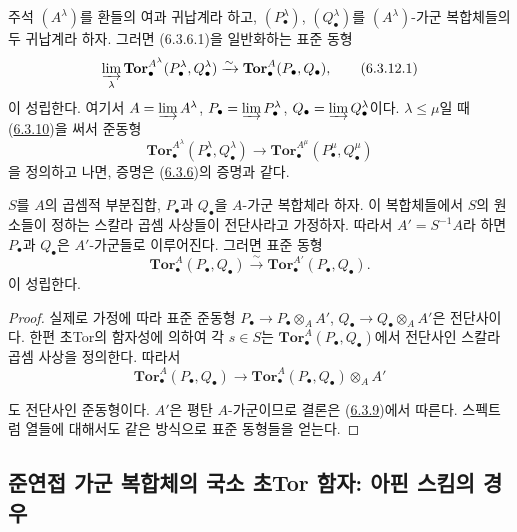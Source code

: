 \begin{namedtheorem}[6.3.12]{주석}
\label{III.6.3.12-fr}
$(A^\lambda)$를 환들의 여과 귀납계라 하고,
$(P_\bullet^\lambda)$, $(Q_\bullet^\lambda)$를
$(A^\lambda)$-가군 복합체들의 두 귀납계라 하자. 그러면
(6.3.6.1)을 일반화하는 표준 동형
\[
  \varinjlim_\lambda
  \mathbf{Tor}_\bullet^{A^\lambda}
  (P_\bullet^\lambda,Q_\bullet^\lambda)
  \xrightarrow{\sim}
  \mathbf{Tor}_\bullet^A(P_\bullet,Q_\bullet),
  \tag{6.3.12.1}\label{III.6.3.12.1.fr}
\]
이 성립한다. 여기서 $A=\varinjlim A^\lambda$,
$P_\bullet=\varinjlim P_\bullet^\lambda$,
$Q_\bullet=\varinjlim Q_\bullet^\lambda$이다. $\lambda\leqslant\mu$일
때 (\hyperref[III.6.3.10-fr]{6.3.10})을 써서 준동형
\[
  \mathbf{Tor}_\bullet^{A^\lambda}
  (P_\bullet^\lambda,Q_\bullet^\lambda)
  \longrightarrow
  \mathbf{Tor}_\bullet^{A^\mu}
  (P_\bullet^\mu,Q_\bullet^\mu)
\]
을 정의하고 나면, 증명은
(\hyperref[III.6.3.6-fr]{6.3.6})의 증명과 같다.
\end{namedtheorem}

\begin{proposition}[6.3.13]
\label{III.6.3.13-fr}
$S$를 $A$의 곱셈적 부분집합, $P_\bullet$과 $Q_\bullet$을 $A$-가군
복합체라 하자. 이 복합체들에서 $S$의 원소들이 정하는 스칼라 곱셈
사상들이 전단사라고 가정하자. 따라서 $A'=S^{-1}A$라 하면
$P_\bullet$과 $Q_\bullet$은 $A'$-가군들로 이루어진다. 그러면 표준
동형
\[
  \mathbf{Tor}_\bullet^A(P_\bullet,Q_\bullet)
  \xrightarrow{\sim}
  \mathbf{Tor}_\bullet^{A'}(P_\bullet,Q_\bullet).
\]
이 성립한다.
\end{proposition}

\begin{proof}
실제로 가정에 따라 표준 준동형
$P_\bullet\to P_\bullet\otimes_A A'$,
$Q_\bullet\to Q_\bullet\otimes_A A'$은 전단사이다. 한편 초Tor의
함자성에 의하여 각 $s\in S$는
$\mathbf{Tor}_\bullet^A(P_\bullet,Q_\bullet)$에서 전단사인 스칼라 곱셈
사상을 정의한다. 따라서
\[
  \mathbf{Tor}_\bullet^A(P_\bullet,Q_\bullet)
  \longrightarrow
  \mathbf{Tor}_\bullet^A(P_\bullet,Q_\bullet)\otimes_A A'
\]


도 전단사인 준동형이다. $A'$은 평탄 $A$-가군이므로 결론은
(\hyperref[III.6.3.9-fr]{6.3.9})에서 따른다. 스펙트럼 열들에 대해서도
같은 방식으로 표준 동형들을 얻는다.
\end{proof}

\subsection{준연접 가군 복합체의 국소 초Tor 함자: 아핀 스킴의 경우}
\label{subsection:III.6.4-ko}

